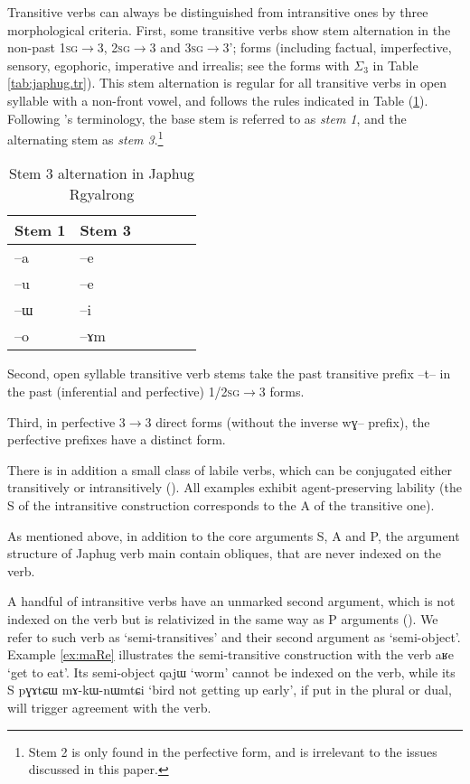 \documentclass[oldfontcommands,oneside,a4paper,11pt]{article}
\newcommand{\ipa}[1]{{\phon \mbox{#1}}} %
\newcommand{\refb}[1]{(\ref{#1})}
\newcommand{\sigc}{$\Sigma_3$}
\begin{document}
Transitive verbs can always be distinguished from intransitive ones by three morphological criteria. First, some transitive verbs show stem alternation in the non-past \textsc{1sg}$\rightarrow$3, \textsc{2sg}$\rightarrow$3 and \textsc{3sg}$\rightarrow$3'; forms (including factual, imperfective, sensory, egophoric, imperative and irrealis; see the forms with \sigc{} in Table \ref{tab:japhug.tr}). This stem alternation is regular for all transitive verbs in open syllable with a non-front vowel, and follows the rules indicated  in Table \refb{tab:stem3}. Following \citet{jackson00puxi}'s terminology, the base stem is referred to as \textit{stem 1}, and the alternating stem as \textit{stem 3}.\footnote{Stem 2 is only found in the perfective form, and is irrelevant to the issues discussed in this paper.}

 \begin{table} 
\caption{Stem 3 alternation in Japhug Rgyalrong} \label{tab:stem3} \centering
\begin{tabular}{llllll}
\toprule
Stem 1 & Stem 3 \\
\midrule
\ipa{--a} & \ipa{--e} \\
\ipa{--u} & \ipa{--e} \\
\ipa{--ɯ} & \ipa{--i} \\
\ipa{--o} & \ipa{--ɤm} \\
\bottomrule
\end{tabular}
\end{table}

 Second, open syllable transitive verb stems take the past transitive prefix \ipa{--t--} in the past (inferential and perfective) \textsc{1/2sg}$\rightarrow$3 forms. 
 
 
 Third, in perfective 3$\rightarrow$3 direct forms (without the inverse \ipa{wɣ--} prefix), the perfective prefixes have a distinct form.

There is in addition a small class of labile verbs, which can be conjugated either transitively or intransitively (\citealt{jacques12demotion}). All examples exhibit agent-preserving  lability (the S of the intransitive construction corresponds to the A of the transitive one).
  
As mentioned above, in addition to the core arguments S, A and P, the argument structure of Japhug verb main contain obliques, that are never indexed on the verb.
  
A handful of intransitive verbs have an unmarked second argument, which is not indexed on the verb but is relativized in the same way as P arguments (\citealt{jacques14relatives}). We refer to such verb as `semi-transitives' and their second argument as `semi-object'.  Example \ref{ex:maRe} illustrates the semi-transitive construction with the verb \ipa{aʁe} `get to eat'. Its semi-object \ipa{qajɯ} `worm' cannot be indexed on the verb, while its S \ipa{pɣɤtɕɯ}  	\ipa{mɤ-kɯ-nɯmtɕi}  `bird not getting up early', if put in the plural or dual, will trigger agreement with the verb.
  
\end{document}
